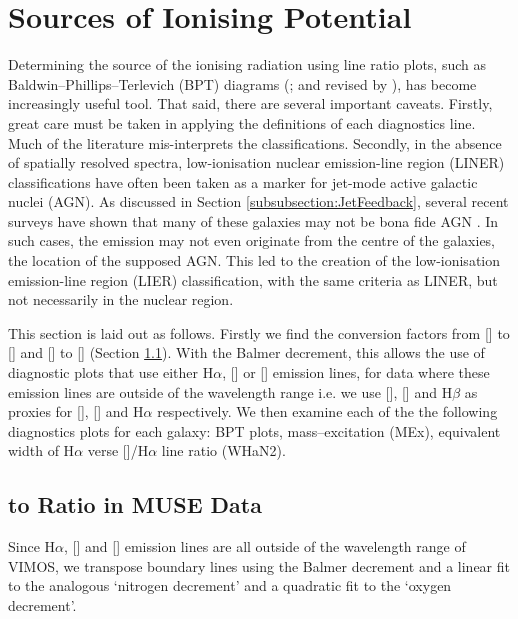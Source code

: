 \section{Sources of Ionising Potential}
	\label{sec:Diagnostics}
	Determining the source of the ionising radiation using line ratio plots, such as Baldwin--Phillips--Terlevich (BPT) diagrams (\citealt{Baldwin1981}; and revised by \citealt{Kewley2001, Kauffmann2003a}), has become increasingly useful tool. That said, there are several important caveats. Firstly, great care must be taken in applying the definitions of each diagnostics line. Much of the literature mis-interprets the classifications. Secondly, in the absence of spatially resolved spectra, low-ionisation nuclear emission-line region (LINER) classifications have often been taken as a marker for jet-mode active galactic nuclei (AGN). As discussed in Section \ref{subsubsection:JetFeedback}, several recent surveys have shown that many of these galaxies may not be bona fide AGN \citep[e.g.][]{Sarzi2005, Sarzi2010, Singh2013, Belfiore2016a}. In such cases, the emission may not even originate from the centre of the galaxies, the location of the supposed AGN. This led to the creation of the low-ionisation emission-line region (LIER) classification, with the same criteria as LINER, but not necessarily in the nuclear region.

	This section is laid out as follows. Firstly we find the conversion factors from [] to [] and [] to [] (Section \ref{subsec:NII_NI}). With the Balmer decrement, this allows the use of diagnostic plots that use either H$\alpha$, [] or [] emission lines, for data where these emission lines are outside of the wavelength range i.e. we use [], [] and H$\beta$ as proxies for [], [] and H$\alpha$ respectively. We then examine each of the the following diagnostics plots for each galaxy: BPT plots, mass--excitation (MEx), equivalent width of H$\alpha$ verse []/H$\alpha$ line ratio (WHaN2).%

	\subsection{ to  Ratio in MUSE Data}
		\label{subsec:NII_NI}
		Since H$\alpha$, [] and [] emission lines are all outside of the wavelength range of VIMOS, we transpose boundary lines 
		using the Balmer decrement and a linear fit to the analogous `nitrogen decrement' and a quadratic fit to the `oxygen decrement'.

